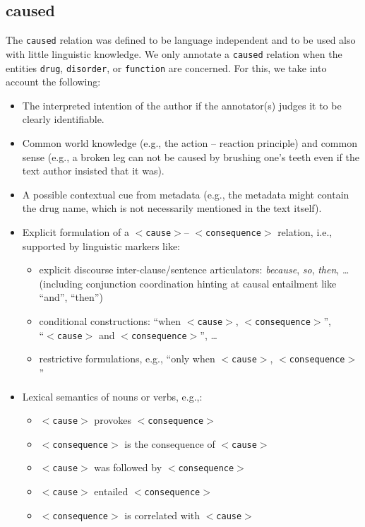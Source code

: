 \documentclass[12pt]{article}
\theoremstyle{definition}
\newcommand{\dis}{\texttt{disorder}\xspace}
\newcommand{\dr}{\texttt{drug}\xspace}
\newcommand{\cause}{$<$\texttt{cause}$>$\xspace}
\newcommand{\conseq}{$<$\texttt{consequence}$>$\xspace}
\begin{document}
\subsection{caused}\label{rel_caused}



The \texttt{caused} relation was defined to be language independent and to be used also with little linguistic knowledge.
We only annotate a \texttt{caused} relation when the entities \dr, \dis, or \texttt{function} are concerned. 
For this, we take into account the following:
\begin{itemize}
    \item The interpreted intention of the author if the annotator(s) judges it to be clearly identifiable.
    \item Common world knowledge (e.g., the action -- reaction principle) and common sense (e.g., a broken leg can not be caused by brushing one's teeth even if the text author insisted that it was).
    \item A possible contextual cue from metadata (e.g., the metadata might contain the drug name, which is not necessarily mentioned in the text itself).
    \item Explicit formulation of a \cause-- \conseq relation, i.e., supported by linguistic markers like:
    \begin{itemize}
        \item explicit discourse inter-clause/sentence articulators: \textit{because}, \textit{so}, \textit{then}, \ldots (including conjunction coordination hinting at  causal entailment like ``and'', ``then'') %
        \item conditional constructions: ``when \cause , \conseq'',  \\ ``\cause and \conseq'', \ldots
        \item restrictive formulations, e.g., ``only when \cause , \conseq''
    \end{itemize}
    \item Lexical semantics of nouns or verbs, e.g.,:
    \begin{itemize}
        \item \cause  provokes \conseq
        \item \conseq is the consequence of \cause
        \item \cause was followed by \conseq
        \item \cause entailed \conseq
        \item \conseq is correlated with \cause

\end{itemize}
\end{itemize}
\end{document}
